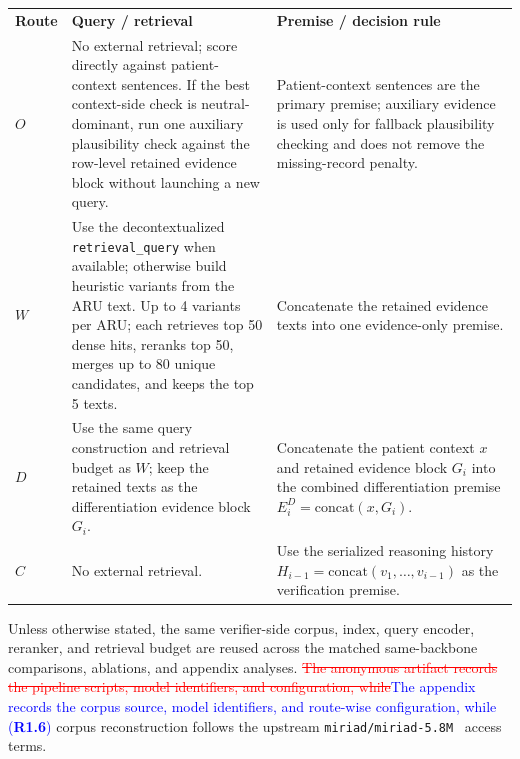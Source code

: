 \documentclass[a4paper,fleqn,doubleblind]{cas-sc}
\DeclareRobustCommand{\deleted}[1]{\textcolor{red}{\sout{#1}}}
\DeclareRobustCommand{\added}[1]{\textcolor{blue}{#1}}
\DeclareRobustCommand{\revtag}[1]{\textcolor{blue}{\scriptsize\,(\textbf{#1})}}
\begin{document}
\begin{table}[htbp]
{    \begin{tabular}{>{\centering\arraybackslash}p{}>{\raggedright\arraybackslash}p{}>{\raggedright\arraybackslash}p{}}
        \toprule
        \multicolumn{3}{l}{\textbf{Panel B: Route-wise premise policy}} \\
        \midrule
        \textbf{Route} & \textbf{Query / retrieval} & \textbf{Premise / decision rule} \\
        \midrule
        $O$ & No external retrieval; score directly against patient-context sentences. If the best context-side check is neutral-dominant, run one auxiliary plausibility check against the row-level retained evidence block without launching a new query. & Patient-context sentences are the primary premise; auxiliary evidence is used only for fallback plausibility checking and does not remove the missing-record penalty. \\
        \midrule
        $W$ & Use the decontextualized \texttt{retrieval\_query} when available; otherwise build heuristic variants from the ARU text. Up to 4 variants per ARU; each retrieves top 50 dense hits, reranks top 50, merges up to 80 unique candidates, and keeps the top 5 texts. & Concatenate the retained evidence texts into one evidence-only premise. \\
        \midrule
        $D$ & Use the same query construction and retrieval budget as $W$; keep the retained texts as the differentiation evidence block $G_i$. & Concatenate the patient context $x$ and retained evidence block $G_i$ into the combined differentiation premise $E_i^{D} = \mathrm{concat}(x, G_i)$. \\
        \midrule
        $C$ & No external retrieval. & Use the serialized reasoning history $H_{i-1} = \mathrm{concat}(v_1, \dots, v_{i-1})$ as the verification premise. \\
        \bottomrule
    \end{tabular}}
\end{table}

Unless otherwise stated, the same verifier-side corpus, index, query encoder, reranker, and retrieval budget are reused across the matched same-backbone comparisons, ablations, and appendix analyses. \deleted{The anonymous artifact records the pipeline scripts, model identifiers, and configuration, while}\added{The appendix records the corpus source, model identifiers, and route-wise configuration, while}\revtag{R1.6} corpus reconstruction follows the upstream \texttt{miriad/miriad-5.8M}~\cite{zheng2025miriad} access terms.
\end{document}

